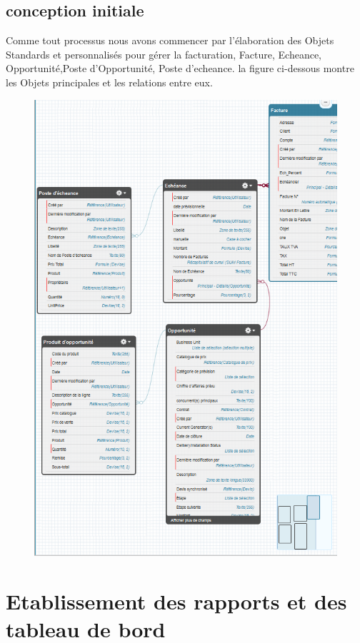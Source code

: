 \documentclass[a4paper, 12pt]{report}
\begin{document}
\begin{itemize}
\subsection{conception initiale}
Comme tout processus nous avons commencer par l'élaboration des Objets Standards et personnalisés pour gérer la facturation,
Facture, Echeance, Opportunité,Poste d'Opportunité, Poste d'echeance.
la figure ci-dessous montre les Objets principales et les relations entre eux.
\begin{figure}[H]
	\centering
		\includegraphics{classfacturation.PNG}
	\label{fig:classfacturation}
\end{figure}





\section{Etablissement des rapports et des tableau de bord}

\end{itemize}
\end{document}
